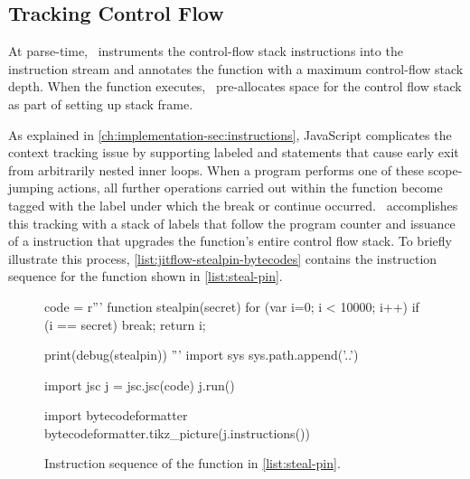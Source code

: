 \subsection{Tracking Control Flow}

At parse-time, \JitFlow\ instruments the control-flow stack instructions into the instruction stream and annotates the function with a maximum control-flow stack depth.
When the function executes, \JitFlow\ pre-allocates space for the control flow stack as part of setting up stack frame.

As explained in \autoref{ch:implementation-sec:instructions}, JavaScript complicates the context tracking issue by supporting labeled  and  statements that cause early exit from arbitrarily nested inner loops.
When a program performs one of these scope-jumping actions, all further operations carried out within the function become tagged with the label under which the break or continue occurred.
\JitFlow\ accomplishes this tracking with a stack of labels that follow the program counter and issuance of a \popj instruction that upgrades the function's entire control flow stack.
To briefly illustrate this process, \autoref{list:jitflow-stealpin-bytecodes} contains the instruction sequence for the  function shown in \autoref{list:steal-pin}.

\lstset{
}
\begin{figure}[h]
\begin{python}
code = r'''
function stealpin(secret) {
  for (var i=0; i < 10000; i++) {
    if (i == secret)
      break;
  }
  return i;
}

print(debug(stealpin))
'''
import sys
sys.path.append('..')

import jsc
j = jsc.jsc(code)
j.run()

import bytecodeformatter
bytecodeformatter.tikz_picture(j.instructions())
\end{python}
  \caption{Instruction sequence of the  function in \autoref{list:steal-pin}.}
  \label{list:jitflow-stealpin-bytecodes}
\end{figure}

